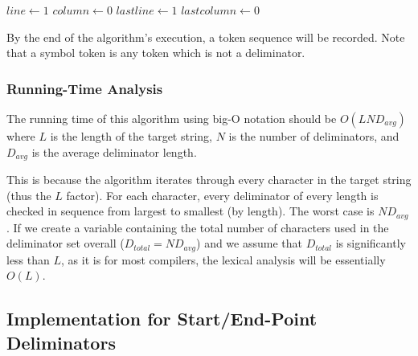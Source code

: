 \documentclass[10pt,a4paper]{article}
\begin{document}
\begin{algorithm}[H]
\caption{$tokenize(T)$}
$line\gets 1$\;
$column\gets 0$\;
$lastline\gets 1$\;
$lastcolumn\gets 0$\;

\end{algorithm}

By the end of the algorithm's execution, a token sequence will be recorded. Note that a symbol token is any token which is not a deliminator.

\subsubsection{Running-Time Analysis}
The running time of this algorithm using big-O notation should be $O(LND_{avg})$ where $L$ is the length of the target string, $N$ is the number of deliminators, and $D_{avg}$ is the average deliminator length.

This is because the algorithm iterates through every character in the target string (thus the $L$ factor). For each character, every deliminator of every length is checked in sequence from largest to smallest (by length). The worst case is $ND_{avg}$. If we create a variable containing the total number of characters used in the deliminator set overall ($D_{total} = ND_{avg}$) and we assume that $D_{total}$ is significantly less than $L$, as it is for most compilers, the lexical analysis will be essentially $O(L)$.

\subsection{Implementation for Start/End-Point Deliminators}
\end{document}
